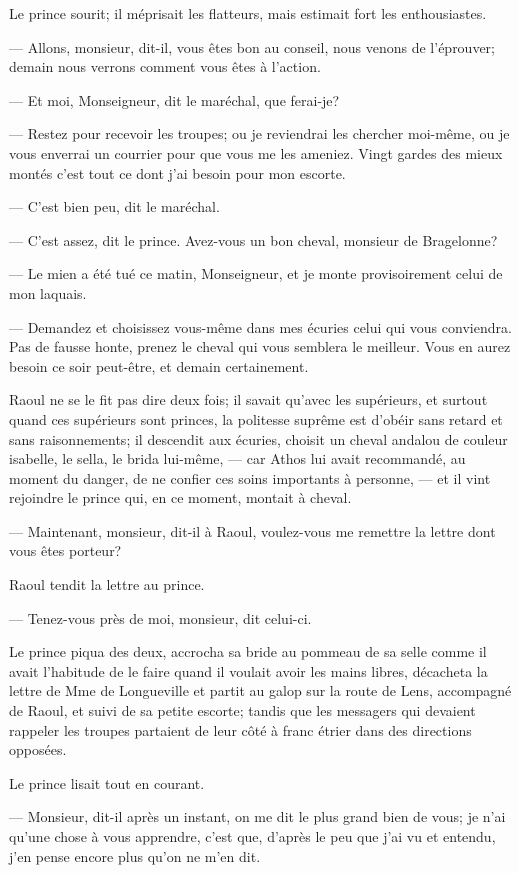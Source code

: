 Le prince sourit; il méprisait les flatteurs, mais estimait fort les enthousiastes.

— Allons, monsieur, dit-il, vous êtes bon au conseil, nous venons de l'éprouver; demain nous verrons comment vous êtes à l'action.

— Et moi, Monseigneur, dit le maréchal, que ferai-je?

— Restez pour recevoir les troupes; ou je reviendrai les chercher moi-même, ou je vous enverrai un courrier pour que vous me les ameniez. Vingt gardes des mieux montés c'est tout ce dont j'ai besoin pour mon escorte.

— C'est bien peu, dit le maréchal.

— C'est assez, dit le prince. Avez-vous un bon cheval, monsieur de Bragelonne?

— Le mien a été tué ce matin, Monseigneur, et je monte provisoirement celui de mon laquais.

— Demandez et choisissez vous-même dans mes écuries celui qui vous conviendra. Pas de fausse honte, prenez le cheval qui vous semblera le meilleur. Vous en aurez besoin ce soir peut-être, et demain certainement.

Raoul ne se le fit pas dire deux fois; il savait qu'avec les supérieurs, et surtout quand ces supérieurs sont princes, la politesse suprême est d'obéir sans retard et sans raisonnements; il descendit aux écuries, choisit un cheval andalou de couleur isabelle, le sella, le brida lui-même, — car Athos lui avait recommandé, au moment du danger, de ne confier ces soins importants à personne, — et il vint rejoindre le prince qui, en ce moment, montait à cheval.

— Maintenant, monsieur, dit-il à Raoul, voulez-vous me remettre la lettre dont vous êtes porteur?

Raoul tendit la lettre au prince.

— Tenez-vous près de moi, monsieur, dit celui-ci.

Le prince piqua des deux, accrocha sa bride au pommeau de sa selle comme il avait l'habitude de le faire quand il voulait avoir les mains libres, décacheta la lettre de Mme de Longueville et partit au galop sur la route de Lens, accompagné de Raoul, et suivi de sa petite escorte; tandis que les messagers qui devaient rappeler les troupes partaient de leur côté à franc étrier dans des directions opposées.

Le prince lisait tout en courant.

— Monsieur, dit-il après un instant, on me dit le plus grand bien de vous; je n'ai qu'une chose à vous apprendre, c'est que, d'après le peu que j'ai vu et entendu, j'en pense encore plus qu'on ne m'en dit.

